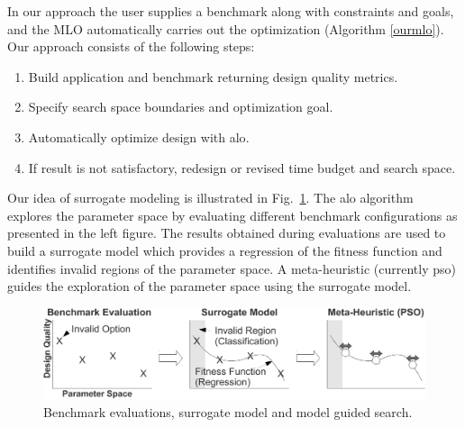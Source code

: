 \documentclass[10pt,conference,a4paper]{IEEEtran}
\begin{document}
In our approach the user supplies a benchmark along with constraints and goals, and the MLO automatically carries out the optimization (Algorithm \ref{ourmlo}). Our approach consists of the following steps:

\begin{enumerate}\addtolength{\itemsep}{-0.1\baselineskip}  
\item Build application and benchmark returning design quality metrics.
\item Specify search space boundaries and optimization goal.
\item Automatically optimize design with \ac{alo}.
\item If result is not satisfactory, redesign or revised time budget and search space.

\end{enumerate}

Our idea of surrogate modeling is illustrated in Fig.~\ref{fig:ouridea}. The \ac{alo} algorithm explores the parameter space by evaluating different benchmark configurations as presented in the left figure. The results obtained during evaluations are used to build a surrogate model which provides a regression of the fitness function and identifies invalid regions of the parameter space. A meta-heuristic (currently \ac{pso}) guides the exploration of the parameter space using the surrogate model. 



  \begin{figure}
     \centering
\includegraphics[width=1.0\textwidth]{./graphics/surrogate_tobias.pdf}
        \caption{Benchmark evaluations, surrogate model and model guided search.}     
           \label{fig:ouridea}
  \end{figure}
 
\end{document}
